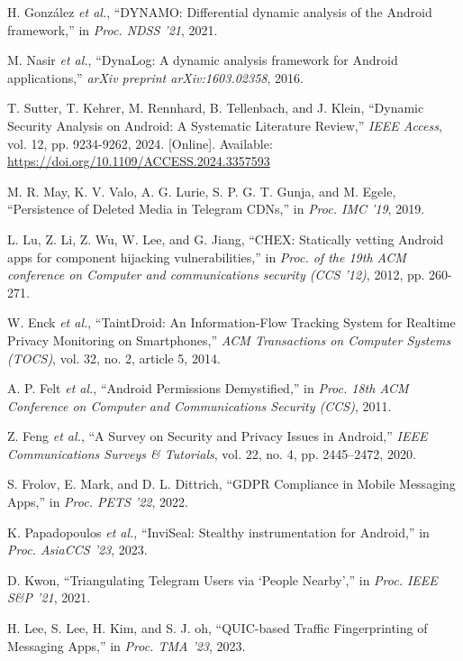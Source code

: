 \documentclass[a4paper,12pt]{report}
\begin{document}
\begin{thebibliography}{99}
H. González \emph{et al.}, “DYNAMO: Differential dynamic analysis of the Android framework,” in \emph{Proc. NDSS '21}, 2021.

M. Nasir \emph{et al.}, “DynaLog: A dynamic analysis framework for Android applications,” \emph{arXiv preprint arXiv:1603.02358}, 2016.

T. Sutter, T. Kehrer, M. Rennhard, B. Tellenbach, and J. Klein, “Dynamic Security Analysis on Android: A Systematic Literature Review,” \emph{IEEE Access}, vol. 12, pp. 9234-9262, 2024. [Online]. Available: \url{https://doi.org/10.1109/ACCESS.2024.3357593}

M. R. May, K. V. Valo, A. G. Lurie, S. P. G. T. Gunja, and M. Egele, “Persistence of Deleted Media in Telegram CDNs,” in \emph{Proc. IMC '19}, 2019.

L. Lu, Z. Li, Z. Wu, W. Lee, and G. Jiang, “CHEX: Statically vetting Android apps for component hijacking vulnerabilities,” in \emph{Proc. of the 19th ACM conference on Computer and communications security (CCS '12)}, 2012, pp. 260-271.

W. Enck \emph{et al.}, “TaintDroid: An Information-Flow Tracking System for Realtime Privacy Monitoring on Smartphones,” \emph{ACM Transactions on Computer Systems (TOCS)}, vol. 32, no. 2, article 5, 2014.

A. P. Felt \emph{et al.}, “Android Permissions Demystified,” in \emph{Proc. 18th ACM Conference on Computer and Communications Security (CCS)}, 2011.

Z. Feng \emph{et al.}, “A Survey on Security and Privacy Issues in Android,” \emph{IEEE Communications Surveys \& Tutorials}, vol. 22, no. 4, pp. 2445–2472, 2020.

S. Frolov, E. Mark, and D. L. Dittrich, “GDPR Compliance in Mobile Messaging Apps,” in \emph{Proc. PETS '22}, 2022.

K. Papadopoulos \emph{et al.}, “InviSeal: Stealthy instrumentation for Android,” in \emph{Proc. AsiaCCS '23}, 2023.

D. Kwon, “Triangulating Telegram Users via ‘People Nearby’,” in \emph{Proc. IEEE S\&P '21}, 2021.

H. Lee, S. Lee, H. Kim, and S. J. oh, “QUIC-based Traffic Fingerprinting of Messaging Apps,” in \emph{Proc. TMA '23}, 2023.


\end{thebibliography}
\end{document}
